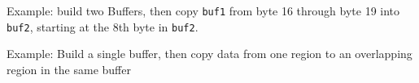Example: build two Buffers, then copy \texttt{buf1} from byte 16 through
byte 19 into \texttt{buf2}, starting at the 8th byte in \texttt{buf2}.

\begin{Shaded}
\begin{Highlighting}[]
 \NormalTok{(}\NormalTok{);}
 \NormalTok{(}\NormalTok{);}

 \NormalTok{(}   
  \NormalTok{; }
  \NormalTok{; }
\NormalTok{\}}

\NormalTok{, }\NormalTok{, }\NormalTok{);}
\NormalTok{(}\NormalTok{(}\NormalTok{, }\NormalTok{, }\NormalTok{));}

\end{Highlighting}
\end{Shaded}

Example: Build a single buffer, then copy data from one region to an
overlapping region in the same buffer

\begin{Shaded}
\begin{Highlighting}[]
 \NormalTok{(}\NormalTok{);}

 \NormalTok{(}   
  \NormalTok{; }
\NormalTok{\}}

\NormalTok{, }\NormalTok{, }\NormalTok{);}
\NormalTok{(}\NormalTok{());}

\end{Highlighting}
\end{Shaded}

